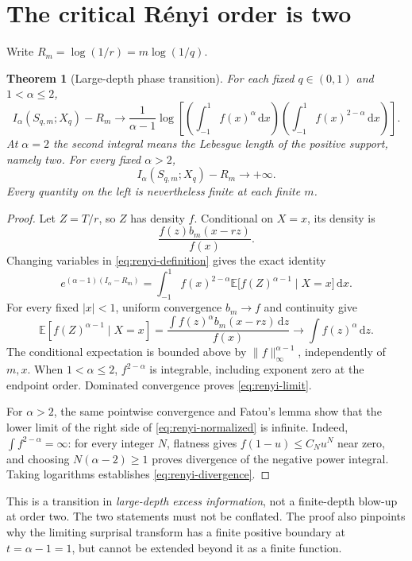 \documentclass[11pt,a4paper]{article}
\numberwithin{equation}{section}
\newtheorem{theorem}{Theorem}[section]
\theoremstyle{definition}\newtheorem{definition}[theorem]{Definition}
\theoremstyle{remark}\newtheorem{remark}[theorem]{Remark}
\newcommand{\E}{\mathbb E}\newcommand{\Pp}{\mathbb P}
\newcommand{\dd}{\,\mathrm d}\newcommand{\ii}{\mathrm i}
\newcommand{\norm}[1]{\lVert #1\rVert}
\begin{document}
\section{The critical R\'enyi order is two}
\label{sec:renyi-phase}
Write $R_m=\log(1/r)=m\log(1/q)$.
\begin{theorem}[Large-depth phase transition]
\label{thm:renyi-phase}
For each fixed $q\in(0,1)$ and $1<\alpha\le2$,
\begin{equation}
 I_\alpha(S_{q,m};X_q)-R_m
 \longrightarrow
 \frac1{\alpha-1}\log\left[
 \left(\int_{-1}^{1}f(x)^\alpha\dd x\right)
 \left(\int_{-1}^{1}f(x)^{2-\alpha}\dd x\right)
 \right].
 \label{eq:renyi-limit}
\end{equation}
At $\alpha=2$ the second integral means the Lebesgue length of the positive support, namely two. For every fixed $\alpha>2$,
\begin{equation}
 I_\alpha(S_{q,m};X_q)-R_m\longrightarrow+\infty.
 \label{eq:renyi-divergence}
\end{equation}
Every quantity on the left is nevertheless finite at each finite $m$.
\end{theorem}
\begin{proof}
Let $Z=T/r$, so $Z$ has density $f$. Conditional on $X=x$, its density is
\[
 \frac{f(z)b_m(x-rz)}{f(x)}.
\]
Changing variables in \eqref{eq:renyi-definition} gives the exact identity
\begin{equation}
 e^{(\alpha-1)(I_\alpha-R_m)}
 =\int_{-1}^{1} f(x)^{2-\alpha}
 \E\bigl[f(Z)^{\alpha-1}\mid X=x\bigr]\dd x.
 \label{eq:renyi-normalized}
\end{equation}
For every fixed $|x|<1$, uniform convergence $b_m\to f$ and continuity give
\[
 \E[f(Z)^{\alpha-1}\mid X=x]
 =\frac{\int f(z)^\alpha b_m(x-rz)\dd z}{f(x)}
 \longrightarrow \int f(z)^\alpha\dd z.
\]
The conditional expectation is bounded above by $\norm f_\infty^{\alpha-1}$, independently of $m,x$. When $1<\alpha\le2$, $f^{2-\alpha}$ is integrable, including exponent zero at the endpoint order. Dominated convergence proves \eqref{eq:renyi-limit}.

For $\alpha>2$, the same pointwise convergence and Fatou's lemma show that the lower limit of the right side of \eqref{eq:renyi-normalized} is infinite. Indeed, $\int f^{2-\alpha}=\infty$: for every integer $N$, flatness gives $f(1-u)\le C_Nu^N$ near zero, and choosing $N(\alpha-2)\ge1$ proves divergence of the negative power integral. Taking logarithms establishes \eqref{eq:renyi-divergence}.
\end{proof}
This is a transition in \emph{large-depth excess information}, not a finite-depth blow-up at order two. The two statements must not be conflated. The proof also pinpoints why the limiting surprisal transform has a finite positive boundary at $t=\alpha-1=1$, but cannot be extended beyond it as a finite function.
\end{document}
